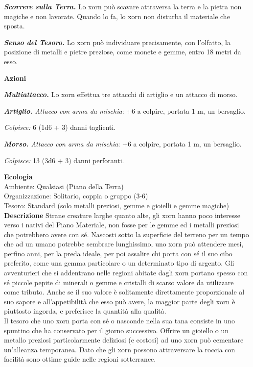 \begin{multicols}{2}
\emph{\textbf{Scorrere sulla Terra.}} Lo xorn può scavare attraversa la terra e la pietra non magiche e non lavorate. Quando lo fa, lo xorn non disturba il materiale che sposta.

\emph{\textbf{Senso del Tesoro.}} Lo xorn può individuare precisamente, con l'olfatto, la posizione di metalli e pietre preziose, come monete e gemme, entro 18 metri da esso.

\textbf{Azioni}

\emph{\textbf{Multiattacco.}} Lo xorn effettua tre attacchi di artiglio e un attacco di morso.

\emph{\textbf{Artiglio.} Attacco con arma da mischia}: +6 a colpire, portata 1 m, un bersaglio.

\emph{Colpisce:} 6 (1d6 + 3) danni taglienti.

\emph{\textbf{Morso.} Attacco con arma da mischia}: +6 a colpire, portata 1 m, un bersaglio.

\emph{Colpisce:} 13 (3d6 + 3) danni perforanti.

\textbf{Ecologia}\\
Ambiente: Qualsiasi (Piano della Terra)\\
Organizzazione: Solitario, coppia o gruppo (3-6)\\
Tesoro: Standard (solo metalli preziosi, gemme e gioielli e gemme magiche)\\
\textbf{Descrizione}
Strane creature larghe quanto alte, gli xorn hanno poco interesse verso i nativi del Piano Materiale, non fosse per le gemme ed i metalli preziosi che potrebbero avere con sé. Nascosti sotto la superficie del terreno per un tempo che ad un umano potrebbe sembrare lunghissimo, uno xorn può attendere mesi, perfino anni, per la preda ideale, per poi assalire chi porta con sé il suo cibo preferito, come una gemma particolare o un determinato tipo di argento. Gli avventurieri che si addentrano nelle regioni abitate dagli xorn portano spesso con sé piccole pepite di minerali o gemme e cristalli di scarso valore da utilizzare come tributo. Anche se il suo valore è solitamente direttamente proporzionale al suo sapore e all'appetibilità che esso può avere, la maggior parte degli xorn è piuttosto ingorda, e preferisce la quantità alla qualità.\\

Il tesoro che uno xorn porta con sé o nasconde nella sua tana consiste in uno spuntino che ha conservato per il giorno successivo. Offrire un gioiello o un metallo preziosi particolarmente deliziosi (e costosi) ad uno xorn può cementare un'alleanza temporanea. Dato che gli xorn possono attraversare la roccia con facilità sono ottime guide nelle regioni sotterranee.\\


\end{multicols}
